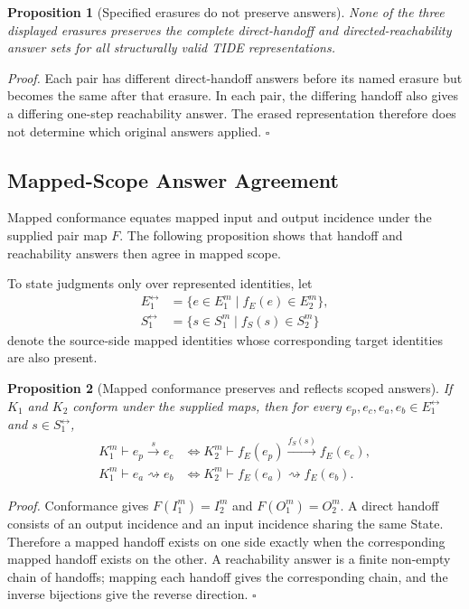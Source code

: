 \documentclass[conference]{IEEEtran}
\theoremstyle{tideproposition}
\newtheorem{proposition}{Proposition}
\newcommand{\direct}[3]{#1\xrightarrow{#2}#3}
\newcommand{\reach}{\rightsquigarrow}
\begin{document}
\begin{proposition}[Specified erasures do not preserve answers]
\label{prop:erasures}
None of the three displayed erasures preserves the complete direct-handoff
and directed-reachability answer sets for all structurally valid TIDE
representations.
\end{proposition}
\noindent\emph{Proof.}
Each pair has different direct-handoff answers before its named erasure but becomes the same after that erasure. In each pair, the differing handoff also gives a differing one-step reachability answer. The erased representation therefore does not determine which original answers applied. \hfill$\square$

\subsection{Mapped-Scope Answer Agreement}
Mapped conformance equates mapped input and output incidence under the supplied pair map $F$. The following proposition shows that handoff and reachability answers then agree in mapped scope.

To state judgments only over represented identities, let
\begin{align*}
E_1^{\leftrightarrow}&=\{e\in E_1^m\mid f_E(e)\in E_2^m\},\\
S_1^{\leftrightarrow}&=\{s\in S_1^m\mid f_S(s)\in S_2^m\}
\end{align*}
denote the source-side mapped identities whose corresponding target identities are also present.

\begin{proposition}[Mapped conformance preserves and reflects scoped answers]\label{prop:conformance}
If $K_1$ and $K_2$ conform under the supplied maps, then for every $e_p,e_c,e_a,e_b\in E_1^{\leftrightarrow}$ and $s\in S_1^{\leftrightarrow}$,
\begin{align}
K_1^m\vdash\direct{e_p}{s}{e_c}
&\Longleftrightarrow
K_2^m\vdash\direct{f_E(e_p)}{f_S(s)}{f_E(e_c)},\\
K_1^m\vdash e_a\reach e_b
&\Longleftrightarrow
K_2^m\vdash f_E(e_a)\reach f_E(e_b).
\end{align}
\end{proposition}
\noindent\emph{Proof.}
Conformance gives $F(I_1^m)=I_2^m$ and $F(O_1^m)=O_2^m$. A direct handoff consists of an output incidence and an input incidence sharing the same State. Therefore a mapped handoff exists on one side exactly when the corresponding mapped handoff exists on the other. A reachability answer is a finite non-empty chain of handoffs; mapping each handoff gives the corresponding chain, and the inverse bijections give the reverse direction. \hfill$\square$
\end{document}

